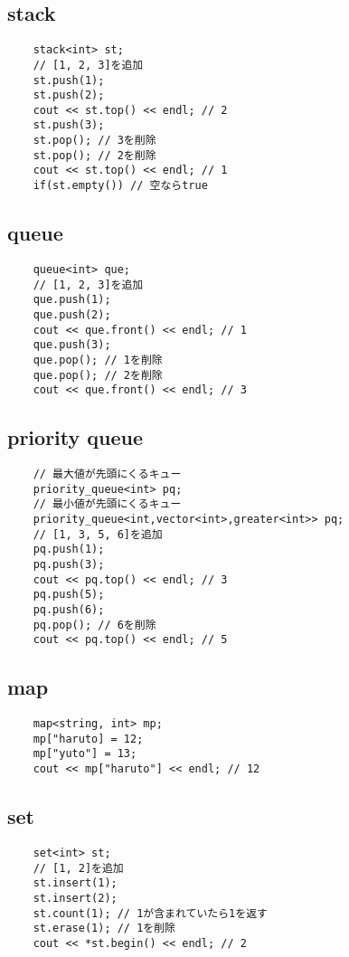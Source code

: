 \documentclass[a4paper, landscape, 9pt]{jarticle} %
\begin{document}
\begin{multicols*}{3}
    \subsection{stack}
    \begin{lstlisting}
    stack<int> st;
    // [1, 2, 3]を追加
    st.push(1);
    st.push(2);
    cout << st.top() << endl; // 2
    st.push(3);
    st.pop(); // 3を削除
    st.pop(); // 2を削除
    cout << st.top() << endl; // 1
    if(st.empty()) // 空ならtrue
    \end{lstlisting}

    \subsection{queue}
    \begin{lstlisting}
    queue<int> que;
    // [1, 2, 3]を追加
    que.push(1);
    que.push(2);
    cout << que.front() << endl; // 1
    que.push(3);
    que.pop(); // 1を削除
    que.pop(); // 2を削除
    cout << que.front() << endl; // 3
    \end{lstlisting}

    \subsection{priority queue}
    \begin{lstlisting}
    // 最大値が先頭にくるキュー
    priority_queue<int> pq;
    // 最小値が先頭にくるキュー
    priority_queue<int,vector<int>,greater<int>> pq;
    // [1, 3, 5, 6]を追加
    pq.push(1);
    pq.push(3);
    cout << pq.top() << endl; // 3
    pq.push(5);
    pq.push(6);
    pq.pop(); // 6を削除
    cout << pq.top() << endl; // 5
    \end{lstlisting}

    \subsection{map}
    \begin{lstlisting}
    map<string, int> mp;
    mp["haruto] = 12;
    mp["yuto"] = 13;
    cout << mp["haruto"] << endl; // 12
    \end{lstlisting}

    \subsection{set}
    \begin{lstlisting}
    set<int> st;
    // [1, 2]を追加
    st.insert(1);
    st.insert(2);
    st.count(1); // 1が含まれていたら1を返す
    st.erase(1); // 1を削除
    cout << *st.begin() << endl; // 2
    \end{lstlisting}


\end{multicols*}
\end{document}
